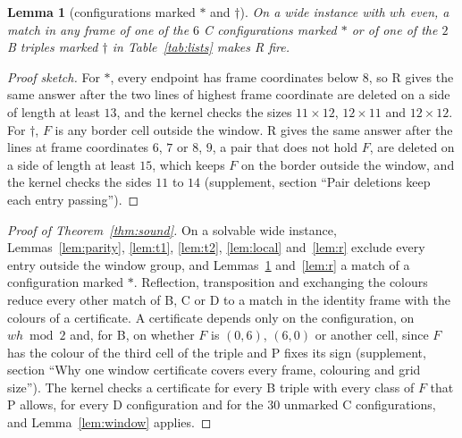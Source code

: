 \documentclass[11pt]{article}
\newtheorem{lemma}[theorem]{Lemma}
\newcommand{\ent}[1]{\textsf{#1}}
\begin{document}
\begin{lemma}[configurations marked $*$ and $\dagger$]\label{lem:c8}
On a wide instance with $wh$ even, a match in any frame of one of the $6$ \ent{C} configurations
marked $*$ or of one of the $2$ \ent{B} triples marked $\dagger$ in Table~\ref{tab:lists} makes
\ent{R} fire.
\end{lemma}
\begin{proof}[Proof sketch]
For $*$, every endpoint has frame coordinates below $8$, so \ent{R} gives the same answer after
the two lines of highest frame coordinate are deleted on a side of length at least $13$, and the
kernel checks the sizes $11\times 12$, $12\times 11$ and $12\times 12$. For $\dagger$, $F$ is any
border cell outside the window. \ent{R} gives the same answer after the lines at frame coordinates $6$, $7$ or
$8$, $9$, a pair that does not hold $F$, are deleted on a side of length at least $15$, which
keeps $F$ on the border outside the window, and the kernel checks the sides $11$ to $14$
(supplement, section ``Pair deletions keep each entry passing'').
\end{proof}

\begin{proof}[Proof of Theorem~\ref{thm:sound}]
On a solvable wide instance, Lemmas~\ref{lem:parity}, \ref{lem:t1}, \ref{lem:t2},
\ref{lem:local} and~\ref{lem:r} exclude every entry outside the window group, and
Lemmas~\ref{lem:c8} and~\ref{lem:r} a match of a configuration marked $*$. Reflection,
transposition and exchanging the colours reduce every other match of \ent{B}, \ent{C} or \ent{D}
to a match in the identity frame with the colours of a certificate. A certificate depends only on
the configuration, on $wh\bmod 2$ and, for \ent{B}, on whether $F$ is $(0,6)$, $(6,0)$ or another
cell, since $F$ has the colour of the third cell of the triple and \ent{P} fixes its sign
(supplement, section ``Why one window certificate covers every frame, colouring and grid size'').
The kernel checks a certificate for every \ent{B} triple with every class of $F$ that \ent{P}
allows, for every \ent{D} configuration and for the $30$ unmarked \ent{C} configurations, and Lemma~\ref{lem:window} applies.
\end{proof}
\end{document}
